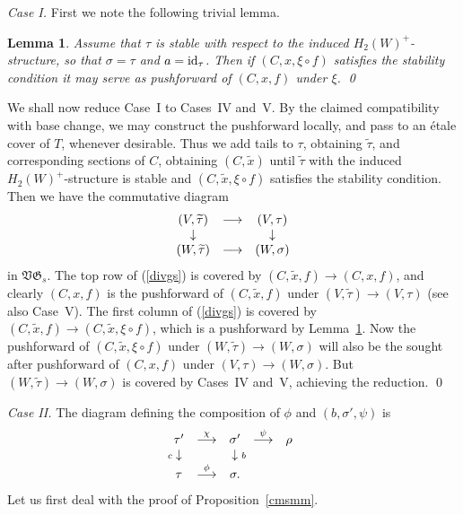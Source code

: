 \documentclass[11pt]{amsart}
\newtheorem{lem}[prop]{Lemma}
\theoremstyle{definition}
\theoremstyle{remark}
\renewcommand{\tilde}{\widetilde}
\newcommand{\GG}{{\mathfrak{G}}}
\newcommand{\VV}{{\mathfrak{V}}}
\newcommand{\id}{\operatorname{\rm id}}
\newcommand{\comp}{\mathbin{{\scriptstyle\circ}}}
\newcommand{\ldiag}[1]
       {\makebox[0cm]{\({\scriptstyle#1}\downarrow\phantom{\scriptstyle#1}\)}}
\newcommand{\rdiag}[1]
       {\makebox[0cm]{\(\phantom{\scriptstyle#1}\downarrow{\scriptstyle#1}\)}}
\newcommand{\comdia}[9]{
\begin{array}{ccc}
#1 & \stackrel{#2}{\longrightarrow} & #3 \\
\ldiag{#4} & #5 & \rdiag{#6} \\
#7 & \stackrel{#8}{\longrightarrow} & #9
\end{array}}
\renewcommand{\t}{_{\tau}}
\theoremstyle{plain}
\theoremstyle{definition}
\theoremstyle{remark}
\begin{document}
{\em Case I\@. } First we note the following trivial lemma.

\begin{lem} \label{tcvw}
Assume that \(\tau\) is stable with respect to the induced \(H_2(W)^+\)-structure,
so that \(\sigma=\tau\) and \(a=\id\t\). Then
if \((C,x,\xi\comp f)\) satisfies the stability condition it may serve as
pushforward of \((C,x,f)\) under \(\xi\). \qed
\end{lem}

We shall now reduce Case~I to Cases~IV and~V\@. By the claimed compatibility
with base change, we may construct the
pushforward locally, and pass to an \'etale cover of \(T\), whenever desirable.
Thus we add tails to \(\tau\), obtaining
\(\tilde{\tau}\), and corresponding sections of \(C\), obtaining \((C,\tilde{x})\)
until \(\tilde{\tau}\) with the induced
\(H_2(W)^+\)-structure is stable and \((C,\tilde{x},\xi\comp f)\) satisfies the
stability condition. Then we have the
commutative diagram
\begin{equation} \label{divgs}
\comdia{(V,\tilde{\tau})}{}{(V,\tau)}{}{}{}{(W,\tilde{\tau})}{}{(W,\sigma)}
\end{equation}
in \(\VV\GG_s\). The top row of (\ref{divgs}) is covered by
\((C,\tilde{x},f)\rightarrow(C,x,f)\), and clearly \((C,x,f)\) is
the pushforward of \((C,\tilde{x},f)\) under
\((V,\tilde{\tau})\rightarrow(V,\tau)\) (see also Case~V). The first column of
(\ref{divgs}) is covered by \((C,\tilde{x},f)\rightarrow(C,\tilde{x},\xi\comp
f)\), which is a pushforward by
Lemma~\ref{tcvw}. Now the pushforward of \((C,\tilde{x},\xi\comp f)\) under
\((W,\tilde{\tau})\rightarrow(W,\sigma)\) will
also be the sought after pushforward of \((C,x,f)\) under
\((V,\tau)\rightarrow(W,\sigma)\). But
\((W,\tilde{\tau})\rightarrow(W,\sigma)\) is covered by Cases~IV and~V, achieving
the reduction. \qed

{\em Case II\@. } The diagram defining the composition of \(\phi\) and
\((b,\sigma',\psi)\) is
\[
\begin{array}{ccccc}
\tau' & \stackrel{\chi}{\longrightarrow} & \sigma' &
\stackrel{\psi}{\longrightarrow} & \rho \\
\ldiag{c} & & \rdiag{b} & & \\
\tau & \stackrel{\phi}{\longrightarrow} & \sigma. & &
\end{array}
\]
Let us first deal with the proof of Proposition~\ref{cmsmm}.
\end{document}
